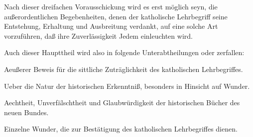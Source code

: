 \begin{aufza}
\item Nach dieser dreifachen Vorausschickung wird es erst möglich seyn, die außerordentlichen Begebenheiten, denen der katholische Lehrbegriff seine Entstehung, Erhaltung und Ausbreitung verdankt, auf eine solche Art vorzuführen, daß ihre Zuverlässigkeit Jedem einleuchten wird.
\end{aufza}\par
Auch dieser Haupttheil wird also in folgende  Unterabtheilungen oder  zerfallen:
\begin{aufzb}
\item[\RWbet{Erstes Hauptstück.}] Aeußerer Beweis für die sittliche Zuträglichkeit des katholischen Lehrbegriffes.\par
\item[\RWbet{Zweites Hauptstück.}] Ueber die Natur der historischen Erkenntniß, besonders in Hinsicht auf Wunder.\par
\item[\RWbet{Drittes Hauptstück.}] Aechtheit, Unverfälschtheit und Glaubwürdigkeit der historischen Bücher des neuen Bundes.\par
\item[\RWbet{Viertes Hauptstück.}] Einzelne Wunder, die zur Bestätigung des katholischen Lehrbegriffes dienen.~
\end{aufzb}

